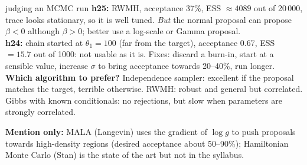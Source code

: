 \begin{example}{judging an MCMC run}
\textbf{h25:} RWMH, acceptance 37\%, ESS $\approx4089$ out of 20\,000, trace looks stationary, so it is well tuned. \emph{But} the normal proposal can propose $\beta<0$ although $\beta>0$; better use a log-scale or Gamma proposal.\\
\textbf{h24:} chain started at $\theta_1=100$ (far from the target), acceptance 0.67, ESS $=15.7$ out of 1000: not usable as it is. Fixes: discard a burn-in, start at a sensible value, increase $\sigma$ to bring acceptance towards 20--40\%, run longer.\\
\textbf{Which algorithm to prefer?} Independence sampler: excellent if the proposal matches the target, terrible otherwise. RWMH: robust and general but correlated. Gibbs with known conditionals: no rejections, but slow when parameters are strongly correlated.
\end{example}

\textbf{Mention only:} MALA (Langevin) uses the gradient of $\log g$ to push proposals towards high-density regions (desired acceptance about 50--90\%); Hamiltonian Monte Carlo (Stan) is the state of the art but not in the syllabus.

